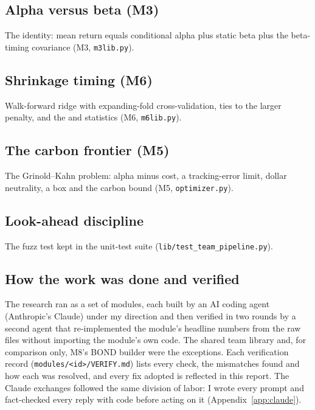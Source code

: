 \subsection{Alpha versus beta (M3)}
The \citet{ln2006} identity: mean return equals conditional alpha plus static beta plus the beta-timing covariance (M3, \texttt{m3lib.py}).


\subsection{Shrinkage timing (M6)}
Walk-forward ridge with expanding-fold cross-validation, ties to the larger penalty, and the \citet{ct2008} and \citet{cw2007} statistics (M6, \texttt{m6lib.py}).



\subsection{The carbon frontier (M5)}
The Grinold--Kahn problem: alpha minus cost, a tracking-error limit, dollar neutrality, a box and the carbon bound (M5, \texttt{optimizer.py}).


\subsection{Look-ahead discipline}
The fuzz test kept in the unit-test suite (\texttt{lib/test\_team\_pipeline.py}).


\subsection{How the work was done and verified}
The research ran as a set of modules, each built by an AI coding agent (Anthropic's Claude) under my direction and then verified in two rounds by a second agent that re-implemented the module's headline numbers from the raw files without importing the module's own code. The shared team library and, for comparison only, M8's BOND builder were the exceptions. Each verification record (\texttt{modules/<id>/VERIFY.md}) lists every check, the mismatches found and how each was resolved, and every fix adopted is reflected in this report. The Claude exchanges followed the same division of labor: I wrote every prompt and fact-checked every reply with code before acting on it (Appendix~\ref{app:claude}).

